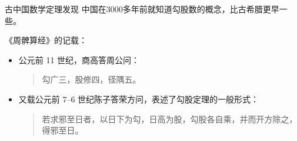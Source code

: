 \documentclass{beamer}
\begin{document}
\begin{frame}{古中国数学}{定理发现}
中国在3000多年前就知道勾股数的概念，比古希腊更早一些。

《周髀算经》的记载：
\begin{itemize}
\item 公元前 11 世纪，商高答周公问：
\begin{quote}
勾广三，股修四，径隅五。
\end{quote}
\item 又载公元前 7--6 世纪陈子答荣方问，表述了勾股定理的一般形式：
\begin{quote}
若求邪至日者，以日下为勾，日高为股，勾股各自乘，并而开方除之，得邪至日。
\end{quote}
\end{itemize}
\end{frame}
\end{document}
